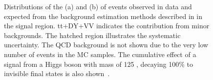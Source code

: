 \begin{figure}
  \caption{Distributions of the \METnoMU (a) and \Mjj (b) of events observed in data and expected from the background estimation methods described in  in the signal region. tt+DY+VV indicates the contribution from minor backgrounds. The hatched region illustrates the systematic uncertainty. The QCD background is not shown due to the very low number of events in the \ac{MC} samples. The cumulative effect of a signal from a Higgs boson with mass of 125 \GeV, decaying 100\% to invisible final states is also shown~\cite{Chatrchyan:2014tja}.}
  \label{fig:promptresults}
\end{figure}

